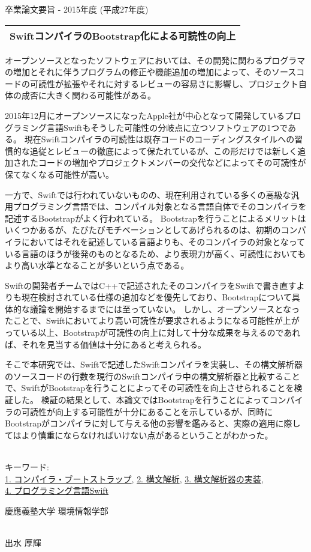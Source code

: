 卒業論文要旨 - 2015年度 (平成27年度)
~ \\
\begin{center}
\begin{Large}
\begin{tabular}{|c|} \hline
SwiftコンパイラのBootstrap化による可読性の向上
\\ \hline
\end{tabular}
\end{Large}
\end{center}

オープンソースとなったソフトウェアにおいては、その開発に関わるプログラマの増加とそれに伴うプログラムの修正や機能追加の増加によって、そのソースコードの可読性が拡張やそれに対するレビューの容易さに影響し、プロジェクト自体の成否に大きく関わる可能性がある。

2015年12月にオープンソースになったApple社が中心となって開発しているプログラミング言語Swiftもそうした可能性の分岐点に立つソフトウェアの1つである。
現在Swiftコンパイラの可読性は既存コードのコーディングスタイルへの習慣的な追従とレビューの徹底によって保たれているが、この形だけでは新しく追加されたコードの増加やプロジェクトメンバーの交代などによってその可読性が保てなくなる可能性が高い。

一方で、Swiftでは行われていないものの、現在利用されている多くの高級な汎用プログラミング言語では、コンパイル対象となる言語自体でそのコンパイラを記述するBootstrapがよく行われている。
Bootstrapを行うことによるメリットはいくつかあるが、たびたびモチベーションとしてあげられるのは、初期のコンパイラにおいてはそれを記述している言語よりも、そのコンパイラの対象となっている言語のほうが後発のものとなるため、より表現力が高く、可読性においてもより高い水準となることが多いという点である。

Swiftの開発者チームではC++で記述されたそのコンパイラをSwiftで書き直すよりも現在検討されている仕様の追加などを優先しており、Bootstrapについて具体的な議論を開始するまでには至っていない。
しかし、オープンソースとなったことで、Swiftにおいてより高い可読性が要求されるようになる可能性が上がっている以上、Bootstrapが可読性の向上に対して十分な成果を与えるのであれば、それを見当する価値は十分にあると考えられる。

そこで本研究では、Swiftで記述したSwiftコンパイラを実装し、その構文解析器のソースコードの行数を現行のSwiftコンパイラ中の構文解析器と比較することで、SwiftがBootstrapを行うことによってその可読性を向上させられることを検証した。
検証の結果として、本論文ではBootstrapを行うことによってコンパイラの可読性が向上する可能性が十分にあることを示しているが、同時にBootstrapがコンパイラに対して与える他の影響を鑑みると、実際の適用に際してはより慎重にならなければいけない点があるということがわかった。

~ \\
キーワード:\\
\underline{1. コンパイラ・ブートストラップ},
\underline{2. 構文解析},
\underline{3. 構文解析器の実装},\\
\underline{4. プログラミング言語Swift}
\begin{flushright}
慶應義塾大学 環境情報学部\\
~ \\
\begin{Large}
出水 厚輝
\end{Large}
\end{flushright}
